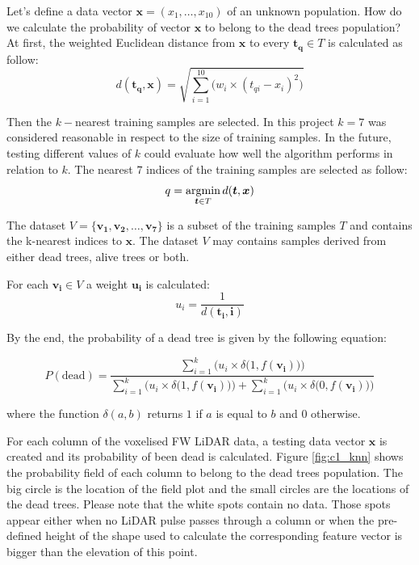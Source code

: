\documentclass{subfiles}
\begin{document}
\par Let's define a data vector $\boldsymbol{x}=(x_1,\dots,x_{10})$ of an unknown population. How do we calculate the probability of vector $\boldsymbol{x}$ to belong to the dead trees population? At first, the weighted Euclidean distance from $\boldsymbol{x}$ to every $\boldsymbol{t_q} \in T$ is calculated as follow:
\begin{equation} 
d(\boldsymbol{t_q},\boldsymbol{x}) = \sqrt{\sum_{i=1}^{10}{ \Big(w_i \times (t_{qi}-x_i)^2 \Big)}}
\end{equation}


\par Then the $k-$nearest training samples are selected. In this project $k=7$ was considered reasonable in respect to the size of training samples. In the future, testing different values of $k$ could evaluate how well the algorithm performs in relation to $k$. The nearest $7$ indices of the training samples are selected as follow:
\begin{equation} 
q = \operatornamewithlimits{argmin}_{\boldsymbol{t} \in T} d(\boldsymbol{t},\boldsymbol{x})
\end{equation}
\par The dataset $V=\{\boldsymbol{v_1}, \boldsymbol{v_2},\dots, \boldsymbol{v_7}\} $ is a subset of the training samples $T$ and contains the k-nearest indices to $\boldsymbol{x}$. The dataset $V$ may contains samples derived from either dead trees, alive trees or both. 


\par For each $\boldsymbol{v_i} \in V$ a weight $\boldsymbol{u_i}$ is calculated:
\begin{equation} 
u_i = \frac{1}{d(\boldsymbol{t_i}, \boldsymbol{i})}
\end{equation}

\par By the end, the probability of a dead tree is given by the following equation: 

\begin{equation} 
P(\textrm{dead}) =  \frac{\sum_{i=1}^{k}{ \Big(u_i \times \delta \big(1,f(\boldsymbol{v_i})\big)\Big)}}{ \sum_{i=1}^{k}{\Big(u_i \times \delta \big(1,f(\boldsymbol{v_i})\big)\Big)} + \sum_{i=1}^{k}{ \Big(u_i \times \delta \big(0,f(\boldsymbol{v_i})\big)\Big)}}
\end{equation}

where the function $\delta(a,b)$ returns $1$ if $a$ is equal to $b$ and $0$ otherwise. 

\par For each column of the voxelised FW LiDAR data, a testing data vector $\boldsymbol{x}$ is created and its probability of been dead is calculated. Figure \ref{fig:c1_knn} shows the probability field of each column to belong to the dead trees population. The big circle is the location of the field plot and the small circles are the locations of the dead trees. Please note that the white spots contain no data. Those spots appear either when no LiDAR pulse passes through a column or when the pre-defined height of the shape used to calculate the corresponding feature vector is bigger than the elevation of this point. 
\end{document}
